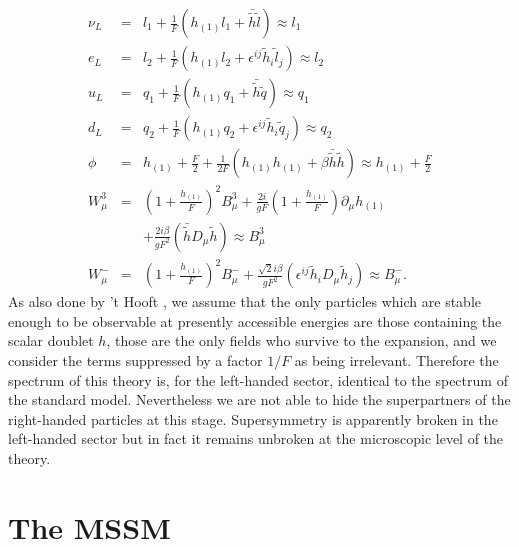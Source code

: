 \documentclass[a4paper,12pt]{article}
\begin{document}
\begin{eqnarray} 
 \nu_L&=&l_1+\frac{1}{F} \left ( h_{(1)} l_1
   + \bar{\tilde{h}} \tilde{l} \right )\approx l_1  \\
  e_L&=&
  l_2+\frac{1}{F} \left ( h_{(1)} l_2 +
\epsilon^{ij} \tilde{h}_i \tilde{l}_j \right )
    \approx l_2 
  \nonumber \\
   u_L&=&q_1+\frac{1}{F} \left ( h_{(1)} q_1
 + \bar{\tilde{h}} \tilde{q} \right )
   \approx q_1 
   \nonumber \\
     d_L&=&q_2 
     +\frac{1}{F} \left ( h_{(1)} q_2
+
\epsilon^{ij} \tilde{h}_i \tilde{q}_j \right )
       \approx q_2
     \nonumber \\
     \phi&=&h_{(1)}+\frac{F}{2} +\frac{1}{2 F}  \left (
     h_{(1)} h_{(1)} + \beta
\bar{\tilde{h}} \tilde{h} \right)
     \approx h_{(1)}+\frac{F}{2}
     \nonumber \\ \nonumber
     W^3_{\mu}&=&\left ( 1 + 
     \frac{h_{(1)}}{F} \right)^2 B^3_{\mu} + \frac{2 i}{g F} \left (1+ 
     \frac{h_{(1)}}{F} \right) \partial_{\mu} h_{(1)}  \\ && \nonumber  
+\frac{2 i\beta}{g F^2} \left ( \bar{\tilde{h}} D_\mu \tilde{h} \right )
   \approx B^3_{\mu}
    \nonumber \\ \nonumber
   W^-_{\mu}&=& \left ( 1 +
     \frac{h_{(1)}}{F} \right)^2 B^-_{\mu} +
\frac{\sqrt{2} i\beta}{g F^2}
\left ( \epsilon^{ij} \tilde{h}_i D_\mu \tilde{h}_j \right )
   \approx B^-_{\mu}. \
\end{eqnarray}
As also done by 't Hooft \cite{tHooft1,tHooft2}, we assume that the
only particles which are stable enough to be observable at presently
accessible energies are those containing the scalar doublet $h$, those
are the only fields who survive to the expansion, and we consider the
terms suppressed by a factor $1/F$ as being irrelevant.  Therefore the
spectrum of this theory is, for the left-handed sector, identical to
the spectrum of the standard model. Nevertheless we are not able to
hide the superpartners of the right-handed particles at this stage.
Supersymmetry is apparently broken in the left-handed sector but in
fact it remains unbroken at the microscopic level of the theory.

\section{The MSSM}
\end{document}
